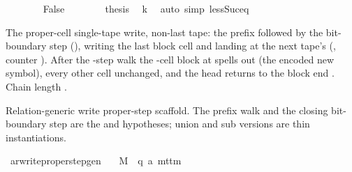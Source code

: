 \begin{isabellebody}
\isanewline
\ \ \ \ \ \ \isamarkupfalse%
\ False\isanewline
\ \ \ \ \ \ \isamarkupfalse%
\ {\isacharquery}{\kern0pt}thesis\ \isamarkupfalse%
\ k\ \isamarkupfalse%
\ {\isacharparenleft}{\kern0pt}auto\ simp{\isacharcolon}{\kern0pt}\ less{\isacharunderscore}{\kern0pt}Suc{\isacharunderscore}{\kern0pt}eq{\isacharparenright}{\kern0pt}\isanewline
\ \ \ \ \isamarkupfalse%
\isanewline
\ \ \isamarkupfalse%
\isanewline
{}\isamarkupfalse%
%
\endisatagproof
{\isafoldproof}%
%
\isadelimproof
%
\endisadelimproof
%
\begin{isamarkuptext}%
The proper-cell single-tape write, non-last tape: the prefix
  followed by the bit-boundary step (),
  writing the last block cell  and landing at the
  next tape's  (, counter
  ).  After the -step walk the -cell
  block at  spells out  (the
  encoded new symbol), every other cell unchanged, and the head returns
  to the block end .  Chain length .%
\end{isamarkuptext}\isamarkuptrue%
%
\begin{isamarkuptext}%
Relation-generic write proper-step scaffold.  The prefix
  walk and the closing bit-boundary step are the 
  and  hypotheses; union and sub versions are
  thin instantiations.%
\end{isamarkuptext}\isamarkuptrue%
\isamarkupfalse%
\ ar{\isacharunderscore}{\kern0pt}write{\isacharunderscore}{\kern0pt}proper{\isacharunderscore}{\kern0pt}step{\isacharunderscore}{\kern0pt}gen{\isacharcolon}{\kern0pt}\isanewline
\ \ \ M\ {\isacharcolon}{\kern0pt}{\isacharcolon}{\kern0pt}\ {\isachardoublequoteopen}{\isacharparenleft}{\kern0pt}{\isacharprime}{\kern0pt}q{\isacharcomma}{\kern0pt}\ {\isacharprime}{\kern0pt}a{\isacharparenright}{\kern0pt}\ mttm{\isachardoublequoteclose}\isanewline

\end{isabellebody}
